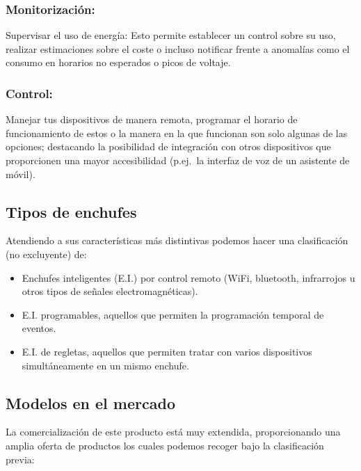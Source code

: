 \documentclass[a4paper,10pt]{article}
\begin{document}
\subsubsection{Monitorización:}\label{monitorizaciuxf3n}

Supervisar el uso de energía: Esto permite establecer un control sobre
su uso, realizar estimaciones sobre el coste o incluso notificar frente
a anomalías como el consumo en horarios no esperados o picos de voltaje.

\subsubsection{Control:}\label{control}

Manejar tus dispositivos de manera remota, programar el horario de
funcionamiento de estos o la manera en la que funcionan son solo algunas
de las opciones; destacando la posibilidad de integración con otros
dispositivos que proporcionen una mayor accesibilidad (p.ej.\ la interfaz
de voz de un asistente de móvil).

\newpage

\subsection{Tipos de enchufes}\label{tipos-de-enchufes}

Atendiendo a sus características más distintivas podemos hacer una
clasificación (no excluyente) de:

\begin{itemize}
\item
  Enchufes inteligentes (E.I.) por control remoto (WiFi, bluetooth,
  infrarrojos u otros tipos de señales electromagnéticas).
\item
  E.I. programables, aquellos que permiten la programación temporal de eventos.
\item
  E.I. de regletas, aquellos que permiten tratar con varios
  dispositivos simultáneamente en un mismo enchufe.
\end{itemize}

\subsection{Modelos en el mercado}\label{modelos-en-el-mercado}

La comercialización de este producto está muy extendida, proporcionando
una amplia oferta de productos los cuales podemos recoger bajo la
clasificación previa:
\end{document}
